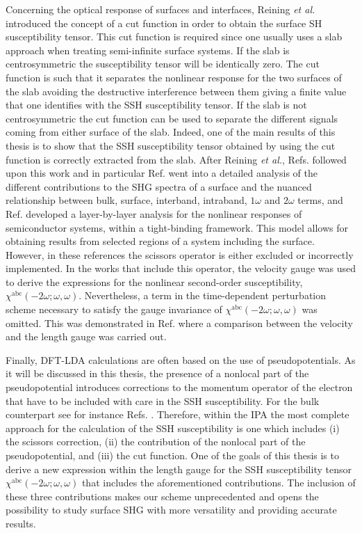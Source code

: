 Concerning the optical response of surfaces and interfaces, Reining \textit{et
al.}\cite{reiningPRB94} introduced the concept of a cut function in order to
obtain the surface SH susceptibility tensor. This cut function is required since
one usually uses a slab approach when treating semi-infinite surface
systems.\cite{reiningPRB94} If the slab is centrosymmetric the susceptibility
tensor will be identically zero. The cut function is such that it separates the
nonlinear response for the two surfaces of the slab avoiding the destructive
interference between them giving a finite value that one identifies with the SSH
susceptibility tensor. If the slab is not centrosymmetric the cut function can
be used to separate the different signals coming from either surface of the
slab. Indeed, one of the main results of this thesis is to show that the SSH
susceptibility tensor obtained by using the cut function is correctly extracted
from the slab. After Reining \textit{et al.},\cite{reiningPRB94} Refs.
\cite{mendozaPRL98,arzatePRB01,mendozaPRB01,mejiaPRB02,sanoPRB02} followed upon
this work and in particular Ref. \cite{arzatePRB01} went into a detailed
analysis of the different contributions to the SHG spectra of a surface and the
nuanced relationship between bulk, surface, interband, intraband, $1\omega$ and
$2\omega$ terms, and Ref. \cite{mejiaRMF04} developed a layer-by-layer analysis
for the nonlinear responses of semiconductor systems, within a tight-binding
framework. This model allows for obtaining results from selected regions of a
system including the surface. However, in these references the scissors operator
is either excluded or incorrectly implemented. In the works that include this
operator, the velocity gauge was used to derive the expressions for the
nonlinear second-order susceptibility,
$\chi^{\mathrm{abc}}(-2\omega;\omega,\omega)$. Nevertheless, a term in the
time-dependent perturbation scheme necessary to satisfy the gauge invariance of
$\chi^{\mathrm{abc}}(-2\omega;\omega,\omega)$  was omitted. This was
demonstrated in Ref. \cite{cabellosPRB09} where a comparison between the
velocity and the length gauge was carried out.

Finally, DFT-LDA calculations are often based on the use of pseudopotentials. As
it will be discussed in this thesis, the presence of a nonlocal part of the
pseudopotential introduces corrections to the momentum operator of the electron
that have to be included with care in the SSH susceptibility. For the bulk
counterpart see for instance Refs. \cite{ismailPRL01,luppiPRB08}. Therefore,
within the IPA the most complete approach for the calculation of the SSH
susceptibility is one which includes (i) the scissors correction, (ii) the
contribution of the nonlocal part of the pseudopotential, and (iii) the cut
function. One of the goals of this thesis is to derive a new expression within
the length gauge for the SSH susceptibility tensor
$\chi^{\mathrm{a}\mathrm{b}\mathrm{c}}(-2\omega;\omega,\omega)$ that includes
the aforementioned contributions. The inclusion of these three contributions
makes our scheme unprecedented and opens the possibility to study surface SHG
with more versatility and providing accurate results.


